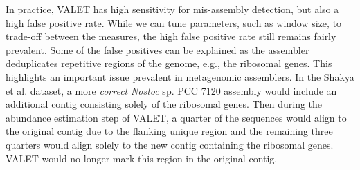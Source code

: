 \documentclass{bioinfo}
\begin{document}
In practice, VALET has high sensitivity for mis-assembly detection, but also a high false positive rate.
While we can tune parameters, such as window size, to trade-off between the measures, the high false positive rate still remains fairly prevalent.
Some of the false positives can be explained as the assembler deduplicates repetitive regions of the genome, e.g., the ribosomal genes.
This highlights an important issue prevalent in metagenomic assemblers.
In the Shakya et al. dataset, a more \emph{correct} \emph{Nostoc} sp. PCC 7120 assembly would include an additional contig consisting solely of the ribosomal genes.
Then during the abundance estimation step of VALET, a quarter of the sequences would align to the original contig due to the flanking unique region and the remaining three quarters would align solely to the new contig containing the ribosomal genes.
VALET would no longer mark this region in the original contig.
\end{document}
